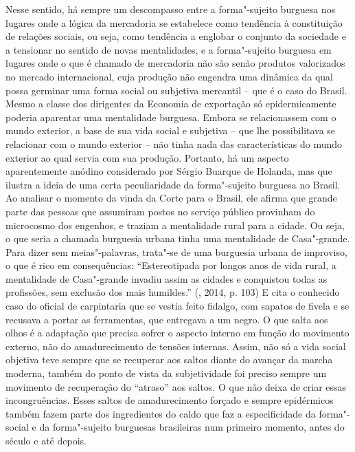 {Nesse sentido, há sempre um descompasso entre a forma"-sujeito burguesa
nos lugares onde a lógica da mercadoria se estabelece como tendência à
constituição de relações sociais, ou seja, como tendência a englobar o
conjunto da sociedade e a tensionar no sentido de novas mentalidades, e
a forma"-sujeito burguesa em lugares onde o que é chamado de mercadoria
não são senão produtos valorizados no mercado internacional, cuja
produção não engendra uma dinâmica da qual possa germinar uma forma
social ou subjetiva mercantil -- que é o caso do Brasil. Mesmo a classe
dos dirigentes da Economia de exportação só epidermicamente poderia
aparentar uma mentalidade burguesa. Embora se relacionassem com o mundo
exterior, a base de sua vida social e subjetiva -- que lhe possibilitava
se relacionar com o mundo exterior -- não tinha nada das características
do mundo exterior ao qual servia com sua produção. Portanto, há um
aspecto aparentemente anódino considerado por Sérgio Buarque de Holanda,
mas que ilustra a ideia de uma certa peculiaridade da forma"-sujeito
burguesa no Brasil. Ao analisar o momento da vinda da Corte para o
Brasil, ele afirma que grande parte das pessoas que assumiram postos no
serviço público provinham do microcosmo dos engenhos, e traziam a
mentalidade rural para a cidade. Ou seja, o que seria a chamada
burguesia urbana tinha uma mentalidade de Casa"-grande. Para dizer sem
meias"-palavras, trata"-se de uma burguesia urbana de improviso, o que é
rico em consequências: ``Estereotipada por longos anos de vida rural, a
mentalidade de Casa"-grande invadiu assim as cidades e conquistou todas
as profissões, sem exclusão dos mais humildes.'' (, 2014, p. 103)
E cita o conhecido caso do oficial de carpintaria que se vestia feito
fidalgo, com sapatos de fivela e se recusava a portar as ferramentas,
que entregava a um negro. O que salta aos olhos é a adaptação que
precisa sofrer o aspecto interno em função do movimento externo, não do
amadurecimento de tensões internas. Assim, não só a vida social objetiva
teve sempre que se recuperar aos saltos diante do avançar da marcha
moderna, também do ponto de vista da subjetividade foi preciso sempre um
movimento de recuperação do ``atraso'' aos saltos. O que não deixa de
criar essas incongruências. Esses saltos de amadurecimento forçado e
sempre epidérmicos também fazem parte dos ingredientes do caldo que faz
a especificidade da forma"-social e da forma"-sujeito burguesas
brasileiras num primeiro momento, antes do século  e até depois.

}
